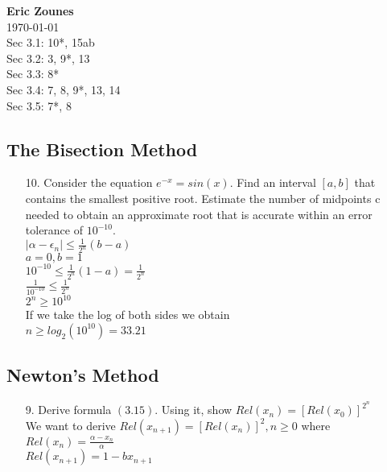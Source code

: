 \documentclass[12pt,letterpaper]{article}
\begin{document}
\begin{flushright}
\end{flushright}
\begin{flushleft}
\textbf{Eric Zounes} \\
\today \\ 
Sec 3.1: 10*, 15ab \\
Sec 3.2: 3, 9*, 13 \\
Sec 3.3: 8* \\
Sec 3.4: 7, 8, 9*, 13, 14 \\
Sec 3.5: 7*, 8 \\
\end{flushleft}
\subsection{The Bisection Method} 
	\begin{enumerate} 
		\item[10.] Consider the equation $e^{-x} = sin(x)$. Find an interval $[a,b]$ that contains the smallest positive root. Estimate the number of midpoints c needed to obtain an approximate root that is accurate within an error tolerance of $10^{-10}$. \\
        $| \alpha - \epsilon_{n} | \leq \frac{1}{2^{n}}(b - a)$ \\
        $a = 0, b = 1$ \\
        $10^{-10} \leq \frac{1}{2^{n}}(1 - a) = \frac{1}{2^{n}}$ \\
        $\frac{1}{10^{-10}} \leq \frac{1}{2^{n}}$ \\
        $2^{n} \geq 10^{10}$ \\
        If we take the log of both sides we obtain \\
        $n \geq log_{2}(10^{10}) = 33.21$ \\ 
	\end{enumerate} 
\subsection{Newton's Method}
	\begin{enumerate} 
		\item[9.] Derive formula $(3.15)$. Using it, show $Rel(x_{n}) = [Rel(x_{0})]^{2^{n}}$ \\
			We want to derive $Rel(x_{n+1}) = [Rel(x_{n})]^{2}, n \geq 0$ where \\
			$Rel(x_{n}) = \frac{\alpha - x_{n}}{\alpha}$ \\   
            $Rel(x_{n+1}) = 1 - bx_{n+1}$ \\

			
	\end{enumerate} 
			
\end{document}
